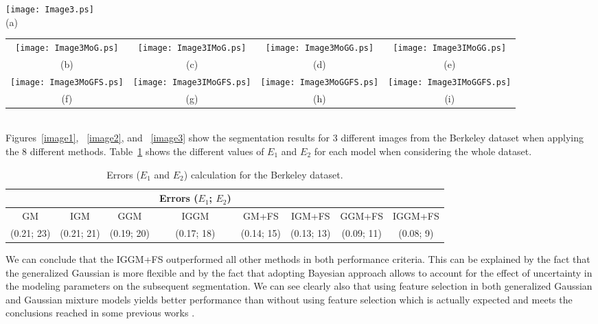 \documentclass[journal,10pt]{elsart}
\begin{document}
\begin{figure*}
\begin{center}
\texttt{[image: Image3.ps]}\\
(a)
\end{center}
\begin{center}
\begin{tabular}{cccc}
 \texttt{[image: Image3MoG.ps]}
&
\texttt{[image: Image3IMoG.ps]}
&
\texttt{[image: Image3MoGG.ps]}
&
\texttt{[image: Image3IMoGG.ps]}
\\
(b)&(c)&(d)&(e)
\\
 \texttt{[image: Image3MoGFS.ps]}
&
\texttt{[image: Image3IMoGFS.ps]}
&
\texttt{[image: Image3MoGGFS.ps]}
&
\texttt{[image: Image3IMoGGFS.ps]}
\\
(f)&(g)&(h)&(i)
\end{tabular}
\caption{Segmentation results for the third image  from the Berkeley dataset. (a) GT, (b) GM, (c) IGM, (d) GGM, (e) IGGM, (f) GM+FS, (g) IGM+FS, (h) GGM+FS, (i) IGGM+FS.}  \label{image3}
\end{center}
\end{figure*}
\\Figures~\ref{image1}, ~\ref{image2}, and ~\ref{image3} show the segmentation results for 3 different images from the Berkeley dataset  when applying the 8 different methods. Table~\ref{tab2} shows the different values of $E_1$ and $E_2$ for each model when considering the whole dataset.
\begin{table}[ht!]
\begin{center}
\caption{Errors ($E_1$ and $E_2$) calculation for the Berkeley dataset. \label{tab2}}
\tiny
\begin{tabular}{|cccccccc|}
  \hline
  &&&Errors ($E_1$; $E_2$)&&&&\\
  \hline
GM&IGM&GGM&IGGM&GM+FS&IGM+FS&GGM+FS&IGGM+FS\\
(0.21; 23)&(0.21; 21)&(0.19; 20)&(0.17; 18)&(0.14; 15)&(0.13; 13)&(0.09; 11)&(0.08; 9)\\
  \hline
\end{tabular}
\end{center}
\end{table}
We can conclude that the IGGM+FS outperformed all other methods in both performance criteria. This can be explained by the fact that the generalized Gaussian is more flexible and by the fact that adopting Bayesian approach allows to account for the effect of uncertainty in the modeling parameters on the subsequent segmentation. We can see clearly also that using feature selection in both generalized Gaussian and Gaussian mixture models yields better performance than without using feature selection which is actually expected and meets the conclusions reached in some previous works \cite{Allili2010}.
\end{document}
